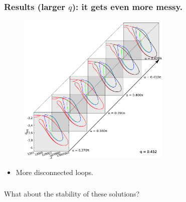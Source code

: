 \documentclass{beamer}
\newcommand{\bi}{\begin{itemize}}
\newcommand{\ei}{\end{itemize}}
\begin{document}


\begin{frame}
	\frametitle{Results (larger $q$): it gets even more messy.}
	\begin{overlayarea}{\textwidth}{\textheight}\vspace{-0.3cm}
		\begin{figure}[htb]
			\begin{center}
				\includegraphics[width=0.65\textwidth]{plots/elastic_beam_I_theta_q_0.452_alpha_restart3.png}
			\end{center}
		\end{figure}\vspace{-0.3cm}
		\bi
		\item More disconnected loops.
		\ei 
	\end{overlayarea}
\end{frame}



\begin{frame}
	\frametitle{\mbox{}}
	\begin{overlayarea}{\textwidth}{\textheight}\vspace{2.2cm}
	\Huge\centering What about the stability of these solutions?
	\end{overlayarea}
\end{frame}

\end{document}
